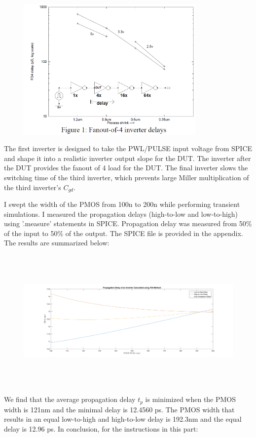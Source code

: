\documentclass[11pt]{article}
\begin{document}
\begin{figure}[H]
	\centerline{\includegraphics[height=7cm]{images/f04_figure.png}}
\end{figure}

The first inverter is designed to take the PWL/PULSE input voltage from SPICE and shape it into a realistic inverter output slope for the DUT. The inverter after the DUT provides the fanout of 4 load for the DUT. The final inverter slows the switching time of the third inverter, which prevents large Miller multiplication of the third inverter's $C_{gd}$.

I swept the width of the PMOS from 100n to 200n while performing transient simulations. I measured the propagation delays (high-to-low and low-to-high) using '.measure' statements in SPICE. Propagation delay was measured from 50\% of the input to 50\% of the output. The SPICE file is provided in the appendix. The results are summarized below:

\begin{figure}[H]
	\centerline{\includegraphics[height=7cm]{images/inverter_delay.png}}
\end{figure}

We find that the average propagation delay $t_p$ is minimized when the PMOS width is 121nm and the minimal delay is 12.4560 ps. The PMOS width that results in an equal low-to-high and high-to-low delay is 192.3nm and the equal delay is 12.96 ps. In conclusion, for the instructions in this part:
\end{document}
